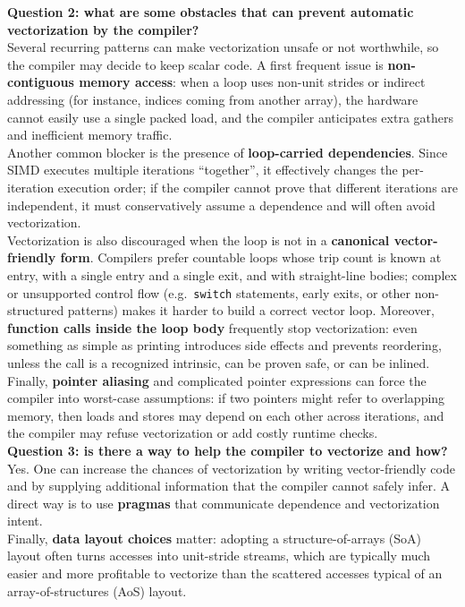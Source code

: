 \documentclass[unicode,10pt,a4paper,oneside,numbers=endperiod,openany]{scrartcl}
\begin{document}
\textbf{Question 2: what are some obstacles that can prevent automatic vectorization by the compiler?}\\
Several recurring patterns can make vectorization unsafe or not worthwhile, so the compiler may decide to keep scalar code. A first frequent issue is \textbf{non-contiguous memory access}: when a loop uses non-unit strides or indirect addressing (for instance, indices coming from another array), the hardware cannot easily use a single packed load, and the compiler anticipates extra gathers and inefficient memory traffic. \\
Another common blocker is the presence of \textbf{loop-carried dependencies}. Since SIMD executes multiple iterations ``together'', it effectively changes the per-iteration execution order; if the compiler cannot prove that different iterations are independent, it must conservatively assume a dependence and will often avoid vectorization.\\
Vectorization is also discouraged when the loop is not in a \textbf{canonical vector-friendly form}. Compilers prefer countable loops whose trip count is known at entry, with a single entry and a single exit, and with straight-line bodies; complex or unsupported control flow (e.g.\ \texttt{switch} statements, early exits, or other non-structured patterns) makes it harder to build a correct vector loop. Moreover, \textbf{function calls inside the loop body} frequently stop vectorization: even something as simple as printing introduces side effects and prevents reordering, unless the call is a recognized intrinsic, can be proven safe, or can be inlined.\\ Finally, \textbf{pointer aliasing} and complicated pointer expressions can force the compiler into worst-case assumptions: if two pointers might refer to overlapping memory, then loads and stores may depend on each other across iterations, and the compiler may refuse vectorization or add costly runtime checks.\\

\textbf{Question 3: is there a way to help the compiler to vectorize and how?}\\
Yes. One can increase the chances of vectorization by writing vector-friendly code and by supplying additional information that the compiler cannot safely infer. A direct way is to use \textbf{pragmas} that communicate dependence and vectorization intent.\\
Finally, \textbf{data layout choices} matter: adopting a structure-of-arrays (SoA) layout often turns accesses into unit-stride streams, which are typically much easier and more profitable to vectorize than the scattered accesses typical of an array-of-structures (AoS) layout.\\
\end{document}
